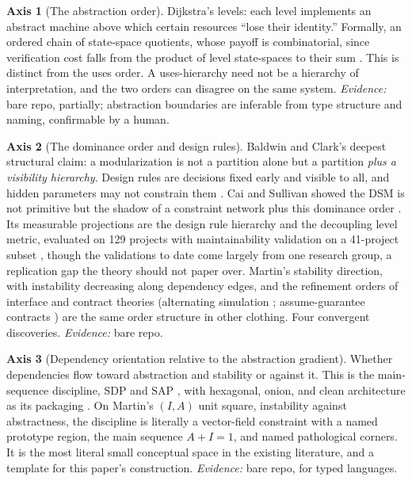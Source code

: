 \documentclass[11pt,oneside]{article}
\theoremstyle{definition}
\newtheorem{axis}{Axis}
\begin{document}
\begin{axis}[The abstraction order]\label{ax:abstraction}
Dijkstra's levels: each level implements an abstract machine above which certain resources
``lose their identity.'' Formally, an ordered chain of state-space quotients, whose payoff is
combinatorial, since verification cost falls from the product of level state-spaces to their sum
\cite{dijkstra1968}. This is distinct from the uses order. A uses-hierarchy need not be a
hierarchy of interpretation, and the two orders can disagree on the same system.
\emph{Evidence:} bare repo, partially; abstraction boundaries are inferable from type structure
and naming, confirmable by a human.
\end{axis}

\begin{axis}[The dominance order and design rules]\label{ax:dominance}
Baldwin and Clark's deepest structural claim: a modularization is not a partition alone but a
partition \emph{plus a visibility hierarchy}. Design rules are decisions fixed early and visible
to all, and hidden parameters may not constrain them \cite{baldwinclark2000}. Cai and Sullivan
showed the DSM is not primitive but the shadow of a constraint network plus this dominance order
\cite{cai2006}. Its measurable projections are the design rule hierarchy and the decoupling
level metric, evaluated on 129 projects with maintainability validation on a 41-project subset
\cite{mo2016}, though the validations to date come largely from one research group, a
replication gap the theory should not paper over. Martin's stability direction, with instability
decreasing along dependency edges, and the refinement orders of interface and contract theories
(alternating simulation \cite{dealfaro2001}; assume-guarantee contracts \cite{benveniste2018})
are the same order structure in other clothing. Four convergent discoveries. \emph{Evidence:}
bare repo.
\end{axis}

\begin{axis}[Dependency orientation relative to the abstraction gradient]\label{ax:orientation}
Whether dependencies flow toward abstraction and stability or against it. This is the
main-sequence discipline, SDP and SAP \cite{martin2002}, with hexagonal, onion, and clean
architecture as its packaging \cite{cockburn2005}. On Martin's $(I,A)$ unit square, instability
against abstractness, the discipline is literally a vector-field constraint with a named
prototype region, the main sequence $A + I = 1$, and named pathological corners. It is the most
literal small conceptual space in the existing literature, and a template for this paper's
construction. \emph{Evidence:} bare repo, for typed languages.
\end{axis}
\end{document}
